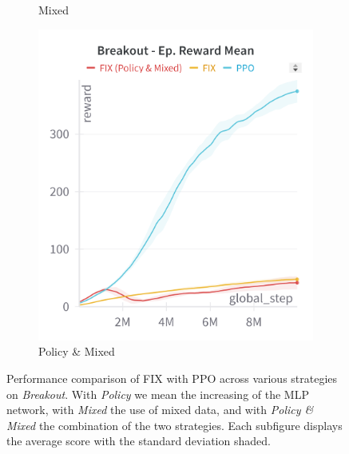 \begin{figure}[ht]
\begin{subfigure}[b]{0.32\textwidth}
        \caption{Mixed}
        \label{fig:breakout_fix_mixed}
    \end{subfigure}
    \hfill
    \begin{subfigure}[b]{0.32\textwidth}
        \centering
        \includegraphics[width=\textwidth]{images/breakout_fix_policy_mixed}
        \caption{Policy \& Mixed}
        \label{fig:breakout_fix_expert_policy}
    \end{subfigure}
    \caption{Performance comparison of FIX with PPO across various strategies on \textit{Breakout}. With \textit{Policy} we mean the increasing of the MLP network, with \textit{Mixed} the use of mixed data, and with \textit{Policy \& Mixed} the combination of the two strategies. Each subfigure displays the average score with the standard deviation shaded.}
    \label{fig:breakout_fix_study}
\end{figure}


